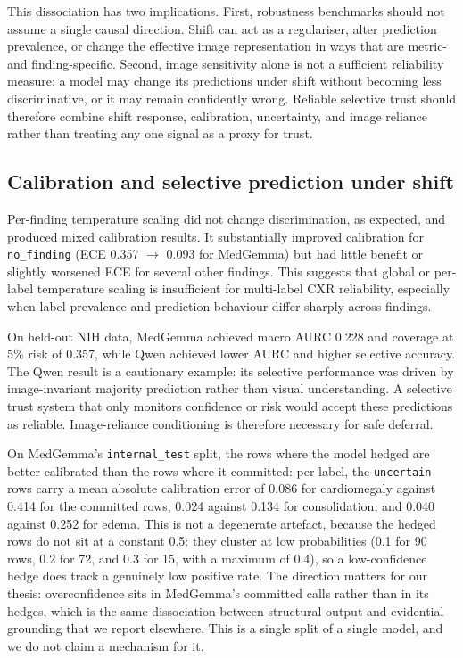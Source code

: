 This dissociation has two implications. First, robustness benchmarks should not assume a single causal direction. Shift can act as a regulariser, alter prediction prevalence, or change the effective image representation in ways that are metric- and finding-specific. Second, image sensitivity alone is not a sufficient reliability measure: a model may change its predictions under shift without becoming less discriminative, or it may remain confidently wrong. Reliable selective trust should therefore combine shift response, calibration, uncertainty, and image reliance rather than treating any one signal as a proxy for trust.

\subsection{Calibration and selective prediction under shift}

Per-finding temperature scaling did not change discrimination, as expected, and produced mixed calibration results. It substantially improved calibration for \texttt{no\_finding} (ECE 0.357 $\rightarrow$ 0.093 for MedGemma) but had little benefit or slightly worsened ECE for several other findings. This suggests that global or per-label temperature scaling is insufficient for multi-label CXR reliability, especially when label prevalence and prediction behaviour differ sharply across findings.

On held-out NIH data, MedGemma achieved macro AURC 0.228 and coverage at 5\% risk of 0.357, while Qwen achieved lower AURC and higher selective accuracy. The Qwen result is a cautionary example: its selective performance was driven by image-invariant majority prediction rather than visual understanding. A selective trust system that only monitors confidence or risk would accept these predictions as reliable. Image-reliance conditioning is therefore necessary for safe deferral.

On MedGemma's \texttt{internal\_test} split, the rows where the model hedged are better calibrated than the rows where it committed: per label, the \texttt{uncertain} rows carry a mean absolute calibration error of 0.086 for cardiomegaly against 0.414 for the committed rows, 0.024 against 0.134 for consolidation, and 0.040 against 0.252 for edema. This is not a degenerate artefact, because the hedged rows do not sit at a constant 0.5: they cluster at low probabilities (0.1 for 90 rows, 0.2 for 72, and 0.3 for 15, with a maximum of 0.4), so a low-confidence hedge does track a genuinely low positive rate. The direction matters for our thesis: overconfidence sits in MedGemma's committed calls rather than in its hedges, which is the same dissociation between structural output and evidential grounding that we report elsewhere. This is a single split of a single model, and we do not claim a mechanism for it.

